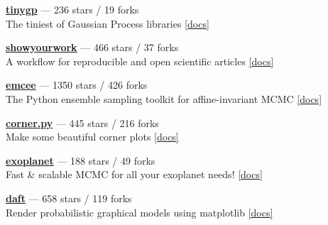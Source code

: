 \item \href{https://github.com/dfm/tinygp}{{\bf tinygp}} --- 236 stars / 19 forks \\
The tiniest of Gaussian Process libraries \href{https://tinygp.readthedocs.io}{[docs]}

\item \href{https://github.com/showyourwork/showyourwork}{{\bf showyourwork}} --- 466 stars / 37 forks \\
A workflow for reproducible and open scientific articles \href{https://show-your.work}{[docs]}

\item \href{https://github.com/dfm/emcee}{{\bf emcee}} --- 1350 stars / 426 forks \\
The Python ensemble sampling toolkit for affine-invariant MCMC \href{https://emcee.readthedocs.io}{[docs]}

\item \href{https://github.com/dfm/corner.py}{{\bf corner.py}} --- 445 stars / 216 forks \\
Make some beautiful corner plots \href{http://corner.readthedocs.io}{[docs]}

\item \href{https://github.com/exoplanet-dev/exoplanet}{{\bf exoplanet}} --- 188 stars / 49 forks \\
Fast {\&} scalable MCMC for all your exoplanet needs!  \href{https://docs.exoplanet.codes}{[docs]}

\item \href{https://github.com/daft-dev/daft}{{\bf daft}} --- 658 stars / 119 forks \\
Render probabilistic graphical models using matplotlib \href{https://docs.daft-pgm.org}{[docs]}
